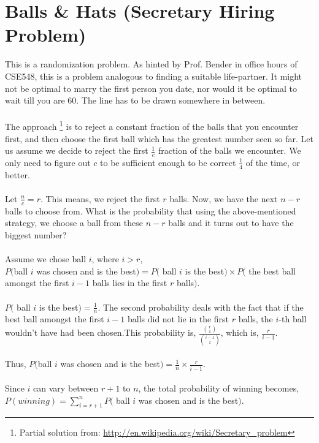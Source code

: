 \documentclass{article}
\begin{document}
\section{Balls \& Hats (Secretary Hiring Problem)}
This is a randomization problem. As hinted by Prof. Bender in office hours of CSE548,
this is a problem analogous to finding a suitable life-partner. It might not
be optimal to marry the first person you date, nor would it be optimal to 
wait till you are 60. The line has to be drawn somewhere in between.\\
\\
The approach \footnote{Partial solution from: \url{http://en.wikipedia.org/wiki/Secretary_problem}} 
is to reject a constant fraction of the balls that you encounter
first, and then choose the first ball which has the greatest number seen so far. 
Let us assume we decide to reject the first $\frac{1}{c}$ fraction of
the balls we encounter. We only need to figure out $c$ to be sufficient enough
to be correct $\frac{1}{4}$ of the time, or better.\\
\\
Let $\frac{n}{c} = r$. This means, we reject the first $r$ balls. Now, we have
the next $n-r$ balls to choose from. What is the probability that using the 
above-mentioned strategy, we choose a ball from these $n-r$ balls and it turns 
out to have the biggest number?\\
\\
Assume we chose ball $i$, where $i > r$, \\
$P($ball $i$ was chosen and is the best$) = P($ ball $i$ is the best$) \times P($ 
the best ball amongst the first $i-1$ balls lies in the first $r$ balls$)$.\\
\\
$P($ ball $i$ is the best$) = \frac{1}{n}$. The second probability deals with the 
fact that if the best ball amongst the first $i-1$ balls did not lie in the first 
$r$ balls, the $i$-th ball wouldn't have had been chosen.This probability is, 
$\frac{\binom{r}{1}}{\binom{i-1}{1}}$, which is, $\frac{r}{i-1}$.\\
\\
Thus, $P($ball $i$ was chosen and is the best$) = \frac{1}{n} \times \frac{r}{i-1}$.\\
\\
Since $i$ can vary between $r+1$ to $n$, the total probability of winning becomes,\\
$P(winning) = \displaystyle\sum\limits_{i=r+1}^n P($ ball $i$ was chosen and is the best$)$.\\
\end{document}
